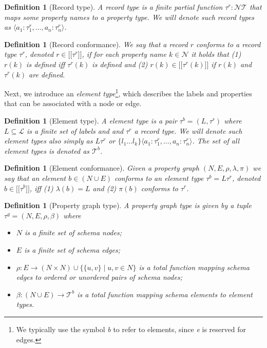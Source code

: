 \documentclass[a4paper]{article}
\makeatletter
\newtheorem{definition}[theorem]{Definition}
\newcommand{\N}{\mathbb{N}}
\newcommand{\ptypes}{\mathcal{T}}
\newcommand{\rtype}{\tau^r}
\newcommand{\btype}{\tau^b}
\newcommand{\btypes}{\mathcal{T}^b}
\newcommand{\gtype}{\tau^g}
\newcommand{\lsem}{\ensuremath{[\![}}
\newcommand{\rsem}{\ensuremath{]\!]}}
\newcommand{\sem}[1]{\ensuremath{\lsem #1 \rsem}}
\newcommand{\pto}{}%
\DeclareRobustCommand{\pto}{\mathrel{\mathpalette\p@to@gets\to}}
\newcommand{\p@to@gets}[2]{%
  \ooalign{\hidewidth$\m@th#1\mapstochar\mkern5mu$\hidewidth\cr$\m@th#1\to$\cr}%
}
\makeatother
\begin{document}
\begin{definition}[Record type]
  A \emph{record type} is a finite partial function $\rtype : \mathcal{N} \pto \ptypes$ that maps some property names to a property type. We will denote such record types as $\langle a_1 : \rtype_1, \ldots, a_n : \rtype_n \rangle$.
\end{definition}

\begin{definition}[Record conformance]
  We say that a record $r$ \emph{conforms} to a record type $\rtype$, denoted $r \in \sem{\rtype}$, if for each property name $k \in \mathcal{N}$ it holds that (1) $r(k)$ is defined iff $\rtype(k)$ is defined and (2) $r(k) \in \sem{\rtype(k)}$ if $r(k)$ and $\rtype(k)$ are defined.
\end{definition}

Next, we introduce an \emph{element type}\footnote{We typically use the symbol \emph{b} to refer to elements, since \emph{e} is reserved for edges.}, which describes the labels and properties that can be associated with a node or edge.

\begin{definition}[Element type]
  A \emph{element type} is a pair $\btype = (L, \rtype)$ where $L \subseteq \mathcal{L}$ is a finite set of labels and and $\rtype$ a record type. We will denote such element types also simply as $L\rtype$ or $\{ l_1 \ldots l_k \} \langle a_1 : \rtype_1, \ldots, a_n : \rtype_n \rangle$. The set of all element types is denoted as $\btypes$.
\end{definition}

\begin{definition}[Element conformance]
  Given a property graph $(N, E, \rho, \lambda, \pi)$ we say that an element $b \in (N \cup E)$ \emph{conforms} to an element type $\btype = L\rtype$, denoted $b \in \sem{\btype}$, iff (1) $\lambda(b) = L$ and (2) $\pi(b)$ conforms to $\rtype$.
\end{definition}

\begin{definition}[Property graph type]
  A \emph{property graph type} is given by a tuple $\gtype = (N, E, \rho, \beta)$ where 
  \begin{itemize}
    \item $N$ is a finite set of schema nodes;
    \item $E$ is a finite set of schema edges;
    \item $\rho : E \to (N \times N) \cup \{\{u, v\} \mid u, v \in N\}$ is a total function mapping schema edges to ordered or unordered pairs of schema nodes;
    \item $\beta : (N \cup E) \to \btypes$ is a total function mapping schema elements to element types.
  \end{itemize}
\end{definition}
\end{document}

